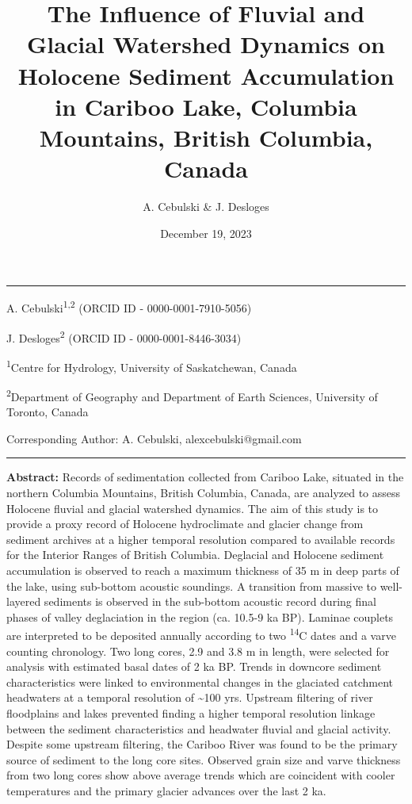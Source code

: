 \documentclass[
  letterpaper,
  DIV=11,
  numbers=noendperiod]{scrartcl}
\title{The Influence of Fluvial and Glacial Watershed Dynamics on
Holocene Sediment Accumulation in Cariboo Lake, Columbia Mountains,
British Columbia, Canada}
\author{A. Cebulski \& J. Desloges}
\date{December 19, 2023}
\begin{document}
\maketitle
\ifdefined\Shaded\renewenvironment{Shaded}{\begin{tcolorbox}[borderline west={3pt}{0pt}{shadecolor}, interior hidden, sharp corners, frame hidden, breakable, boxrule=0pt, enhanced]}{\end{tcolorbox}}\fi

\begin{center}\rule{0.5\linewidth}{0.5pt}\end{center}

A. Cebulski\textsuperscript{1,2} (ORCID ID - 0000-0001-7910-5056)

J. Desloges\textsuperscript{2} (ORCID ID - 0000-0001-8446-3034)

\textsuperscript{1}Centre for Hydrology, University of Saskatchewan,
Canada

\textsuperscript{2}Department of Geography and Department of Earth
Sciences, University of Toronto, Canada

Corresponding Author: A. Cebulski, alexcebulski@gmail.com

\begin{center}\rule{0.5\linewidth}{0.5pt}\end{center}

\pagebreak

\textbf{Abstract:} Records of sedimentation collected from Cariboo Lake,
situated in the northern Columbia Mountains, British Columbia, Canada,
are analyzed to assess Holocene fluvial and glacial watershed dynamics.
The aim of this study is to provide a proxy record of Holocene
hydroclimate and glacier change from sediment archives at a higher
temporal resolution compared to available records for the Interior
Ranges of British Columbia. Deglacial and Holocene sediment accumulation
is observed to reach a maximum thickness of 35 m in deep parts of the
lake, using sub-bottom acoustic soundings. A transition from massive to
well-layered sediments is observed in the sub-bottom acoustic record
during final phases of valley deglaciation in the region (ca. 10.5-9 ka
BP). Laminae couplets are interpreted to be deposited annually according
to two \textsuperscript{14}C dates and a varve counting chronology. Two
long cores, 2.9 and 3.8 m in length, were selected for analysis with
estimated basal dates of 2 ka BP. Trends in downcore sediment
characteristics were linked to environmental changes in the glaciated
catchment headwaters at a temporal resolution of \textasciitilde100 yrs.
Upstream filtering of river floodplains and lakes prevented finding a
higher temporal resolution linkage between the sediment characteristics
and headwater fluvial and glacial activity. Despite some upstream
filtering, the Cariboo River was found to be the primary source of
sediment to the long core sites. Observed grain size and varve thickness
from two long cores show above average trends which are coincident with
cooler temperatures and the primary glacier advances over the last 2 ka.
\end{document}
